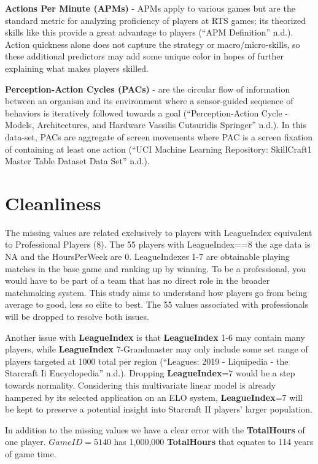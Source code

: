 \documentclass[]{article}
\begin{document}
\textbf{Actions Per Minute (APMs)} - APMs apply to various games but are
the standard metric for analyzing proficiency of players at RTS games;
its theorized skills like this provide a great advantage to players
(``APM Definition'' n.d.). Action quickness alone does not capture the
strategy or macro/micro-skills, so these additional predictors may add
some unique color in hopes of further explaining what makes players
skilled.

\textbf{Perception-Action Cycles (PACs)} - are the circular flow of
information between an organism and its environment where a
sensor-guided sequence of behaviors is iteratively followed towards a
goal (``Perception-Action Cycle - Models, Architectures, and Hardware
\textbar{} Vassilis Cutsuridis \textbar{} Springer'' n.d.). In this
data-set, PACs are aggregate of screen movements where PAC is a screen
fixation of containing at least one action (``UCI Machine Learning
Repository: SkillCraft1 Master Table Dataset Data Set'' n.d.).

\hypertarget{cleanliness}{%
\section{Cleanliness}\label{cleanliness}}

The missing values are related exclusively to players with LeagueIndex
equivalent to Professional Players (8). The 55 players with
LeagueIndex==8 the age data is NA and the HoursPerWeek are 0.
LeagueIndexes 1-7 are obtainable playing matches in the base game and
ranking up by winning. To be a professional, you would have to be part
of a team that has no direct role in the broader matchmaking system.
This study aims to understand how players go from being average to good,
less so elite to best. The 55 values associated with professionals will
be dropped to resolve both issues.

Another issue with \textbf{LeagueIndex} is that \textbf{LeagueIndex} 1-6
may contain many players, while \textbf{LeagueIndex} 7-Grandmaster may
only include some set range of players targeted at 1000 total per region
(``Leagues: 2019 - Liquipedia - the Starcraft Ii Encyclopedia'' n.d.).
Dropping \textbf{LeagueIndex}=7 would be a step towards normality.
Considering this multivariate linear model is already hampered by its
selected application on an ELO system, \textbf{LeagueIndex}=7 will be
kept to preserve a potential insight into Starcraft II players' larger
population.

In addition to the missing values we have a clear error with the
\textbf{TotalHours} of one player. \(GameID = 5140\) has 1,000,000
\textbf{TotalHours} that equates to 114 years of game time.
\end{document}
